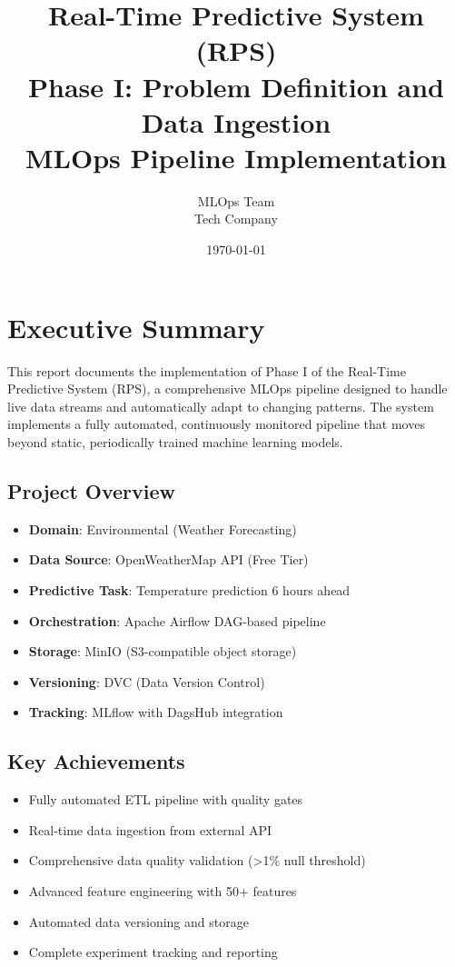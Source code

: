 \documentclass[12pt,a4paper]{article}
\title{\textbf{Real-Time Predictive System (RPS) \\
Phase I: Problem Definition and Data Ingestion \\
MLOps Pipeline Implementation}}
\author{MLOps Team \\
Tech Company}
\date{\today}
\begin{document}
\maketitle
\thispagestyle{empty}

\newpage
\tableofcontents
\newpage

\section{Executive Summary}

This report documents the implementation of Phase I of the Real-Time Predictive System (RPS), a comprehensive MLOps pipeline designed to handle live data streams and automatically adapt to changing patterns. The system implements a fully automated, continuously monitored pipeline that moves beyond static, periodically trained machine learning models.

\subsection{Project Overview}
\begin{itemize}
    \item \textbf{Domain}: Environmental (Weather Forecasting)
    \item \textbf{Data Source}: OpenWeatherMap API (Free Tier)
    \item \textbf{Predictive Task}: Temperature prediction 6 hours ahead
    \item \textbf{Orchestration}: Apache Airflow DAG-based pipeline
    \item \textbf{Storage}: MinIO (S3-compatible object storage)
    \item \textbf{Versioning}: DVC (Data Version Control)
    \item \textbf{Tracking}: MLflow with DagsHub integration
\end{itemize}

\subsection{Key Achievements}
\begin{itemize}
    \item Fully automated ETL pipeline with quality gates
    \item Real-time data ingestion from external API
    \item Comprehensive data quality validation (>1\% null threshold)
    \item Advanced feature engineering with 50+ features
    \item Automated data versioning and storage
    \item Complete experiment tracking and reporting
\end{itemize}
\end{document}
